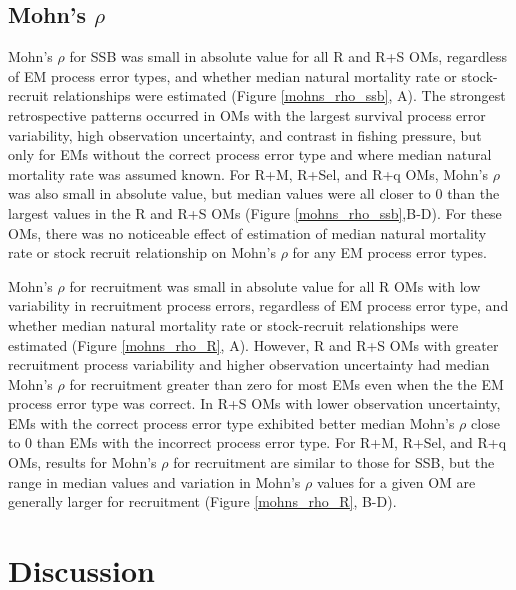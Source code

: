 \documentclass[
  12pt,
]{article}
\begin{document}
\hypertarget{mohns-rho-1}{%
\subsection*{\texorpdfstring{Mohn's
\(\rho\)}{Mohn's \textbackslash rho}}\label{mohns-rho-1}}

Mohn's \(\rho\) for SSB was small in absolute value for all R and R+S
OMs, regardless of EM process error types, and whether median natural
mortality rate or stock-recruit relationships were estimated (Figure
\ref{mohns_rho_ssb}, A). The strongest retrospective patterns occurred
in OMs with the largest survival process error variability, high
observation uncertainty, and contrast in fishing pressure, but only for
EMs without the correct process error type and where median natural
mortality rate was assumed known. For R+M, R+Sel, and R+q OMs, Mohn's
\(\rho\) was also small in absolute value, but median values were all
closer to 0 than the largest values in the R and R+S OMs (Figure
\ref{mohns_rho_ssb},B-D). For these OMs, there was no noticeable effect
of estimation of median natural mortality rate or stock recruit
relationship on Mohn's \(\rho\) for any EM process error types.

Mohn's \(\rho\) for recruitment was small in absolute value for all R
OMs with low variability in recruitment process errors, regardless of EM
process error type, and whether median natural mortality rate or
stock-recruit relationships were estimated (Figure \ref{mohns_rho_R},
A). However, R and R+S OMs with greater recruitment process variability
and higher observation uncertainty had median Mohn's \(\rho\) for
recruitment greater than zero for most EMs even when the the EM process
error type was correct. In R+S OMs with lower observation uncertainty,
EMs with the correct process error type exhibited better median Mohn's
\(\rho\) close to 0 than EMs with the incorrect process error type. For
R+M, R+Sel, and R+q OMs, results for Mohn's \(\rho\) for recruitment are
similar to those for SSB, but the range in median values and variation
in Mohn's \(\rho\) values for a given OM are generally larger for
recruitment (Figure \ref{mohns_rho_R}, B-D).

\hypertarget{discussion}{%
\section*{Discussion}\label{discussion}}
\end{document}
